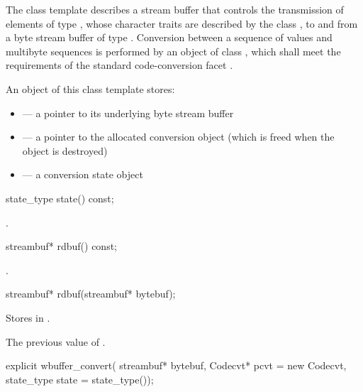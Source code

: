 \pnum
The class template describes a stream buffer that controls the
transmission of elements of type , whose character traits are
described by the class , to and from a byte stream buffer of type
. Conversion between a sequence of  values and
multibyte sequences is performed by an object of class
, which shall meet the requirements
of the standard code-conversion facet .

\pnum
An object of this class template stores:

\begin{itemize}
\item {} --- a pointer to its underlying byte stream buffer
\item {} --- a pointer to the allocated conversion object
(which is freed when the  object is destroyed)
\item {} --- a conversion state object
\end{itemize}

%
\begin{itemdecl}
state_type state() const;
\end{itemdecl}

\begin{itemdescr}
\pnum
\returns
{}.
\end{itemdescr}

%
\begin{itemdecl}
streambuf* rdbuf() const;
\end{itemdecl}

\begin{itemdescr}
\pnum
\returns
{}.
\end{itemdescr}

%
\begin{itemdecl}
streambuf* rdbuf(streambuf* bytebuf);
\end{itemdecl}

\begin{itemdescr}
\pnum
\effects
Stores  in .

\pnum
\returns
The previous value of .
\end{itemdescr}

%
\begin{itemdecl}
explicit wbuffer_convert(
    streambuf* bytebuf,
    Codecvt* pcvt = new Codecvt,
    state_type state = state_type());
\end{itemdecl}

